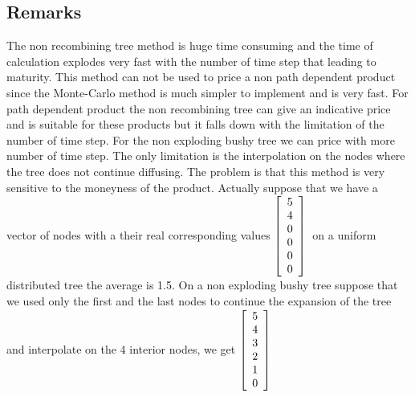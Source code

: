 \subsection{Remarks}
\label{sec:Remarks}
The non recombining tree method is huge time consuming and the time of calculation explodes very fast with the number of time step that leading to maturity. This method can not be used to price a non path dependent product since the Monte-Carlo method is much simpler to implement and is very fast. For path dependent product the non recombining tree can give an indicative price and is suitable for these products but it falls down with the limitation of the number of time step.
For the non exploding bushy tree we can price with more number of time step. The only limitation is the interpolation on the nodes where the tree does not continue diffusing. The problem is that this method is very sensitive to the moneyness of the product. Actually suppose that we have a vector of nodes with a their real corresponding values
\begin{math}
\left[
\begin{array}{c}
			5\\
      4\\
      0\\ 
      0\\
      0\\
      0\\
\end{array}
\right]\\
\end{math}
on a uniform distributed tree the average is 1.5. On a non exploding bushy tree suppose that we used only the first and the last nodes to continue the expansion of the tree and interpolate on the 4 interior nodes, we get
\begin{math}
\left[
\begin{array}{c}
			5\\
      4\\
      3\\ 
      2\\
      1\\
      0\\
\end{array}
\right]\\
\end{math}
